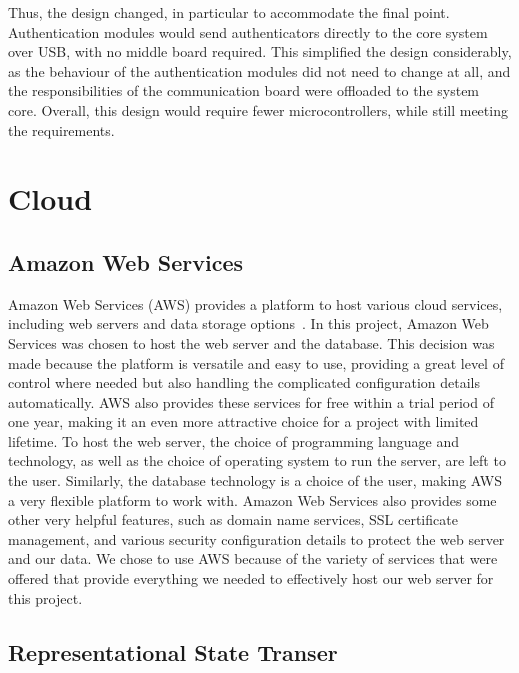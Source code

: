 \documentclass[12pt]{report}
\let\Oldsection\section
\renewcommand{\section}{\FloatBarrier\Oldsection}
\let\Oldsubsection\subsection
\renewcommand{\subsection}{\FloatBarrier\Oldsubsection}
\begin{document}
Thus, the design changed, in particular to accommodate the final point. Authentication modules would send 
authenticators directly to the core system over USB, with no middle board required. This simplified the design 
considerably, as the behaviour of the authentication modules did not need to change at all, and the responsibilities 
of the communication board were offloaded to the system core. Overall, this design would require fewer 
microcontrollers, while still meeting the requirements.


\section{Cloud} \label{cloud}


\subsection{Amazon Web Services} \label{amazon-web-services}

Amazon Web Services (AWS) provides a platform to host various cloud services,
including web servers and data storage options~\autocite{AMAZONWEBSERVICES}. In this
project, Amazon Web Services was chosen to host the web server and the database. This
decision was made because the platform is versatile and easy to use, providing a great level of
control where needed but also handling the complicated configuration details automatically.
AWS also provides these services for free within a trial period of one year, making it an even
more attractive choice for a project with limited lifetime. To host the web server, the choice of
programming language and technology, as well as the choice of operating system to run the
server, are left to the user. Similarly, the database technology is a choice of the user, making
AWS a very flexible platform to work with. Amazon Web Services also provides some other
very helpful features, such as domain name services, SSL certificate management, and various
security configuration details to protect the web server and our data. We chose to use AWS
because of the variety of services that were offered that provide everything we needed to
effectively host our web server for this project.

\subsection{Representational State Transer} \label{representational-state-transer}
\end{document}
